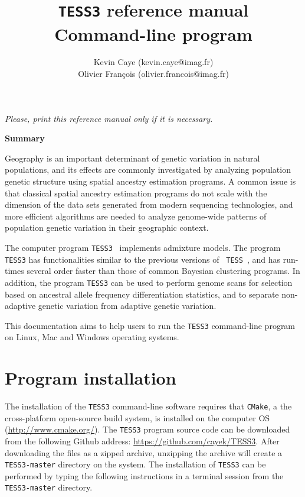 \documentclass[12pt,a4paper]{article}
\title{{\tt TESS3} reference manual \\
Command-line program
}
\author{
        Kevin Caye (kevin.caye@imag.fr)\\
        Olivier Fran\c cois (olivier.francois@imag.fr)\\
}
\begin{document}
\maketitle
\begin{center}
{\it Please, print this reference manual only if it is necessary.}
\end{center}

\vspace{.5cm}

\begin{center} {\bf Summary}
\end{center}


\vspace{.5cm}

Geography is an important determinant of genetic variation in natural 
populations, and its effects are commonly investigated by analyzing population 
genetic structure using spatial ancestry estimation programs. A common issue is 
that classical spatial ancestry estimation programs do not scale with the 
dimension of the data sets generated from modern sequencing technologies, and 
more efficient algorithms are needed to analyze genome-wide patterns of 
population genetic variation in their geographic context.

The computer program {\tt TESS3}~\cite{TESS3} implements admixture models. The program {\tt TESS3} has 
functionalities similar to the previous versions of {\tt 
TESS}~\cite{chen2007bayesian,durand2009spatial}, and has run-times several order 
faster than those of common Bayesian clustering programs. In addition, the 
program {\tt TESS3} can be used to perform genome scans for selection based on ancestral 
allele frequency differentiation statistics, and to separate non-adaptive genetic variation from 
adaptive genetic variation.

This documentation aims to help users to run the {\tt TESS3} command-line program 
on Linux, Mac and Windows operating systems. 

\vspace{.5cm}


\section{Program installation} 

The installation of the {\tt TESS3} command-line software requires that {\tt CMake}, a the cross-platform 
open-source build system, is installed on the computer OS (\url{http://www.cmake.org/}).  The {\tt TESS3}  program source code can be downloaded 
from the following Github address: \url{https://github.com/cayek/TESS3}. After 
downloading the files as a zipped archive, unzipping the archive will create a 
{\tt TESS3-master} directory on the system. 
The installation of {\tt TESS3} can be performed by typing the 
following instructions in a terminal session from the {\tt TESS3-master} 
directory.
\end{document}
